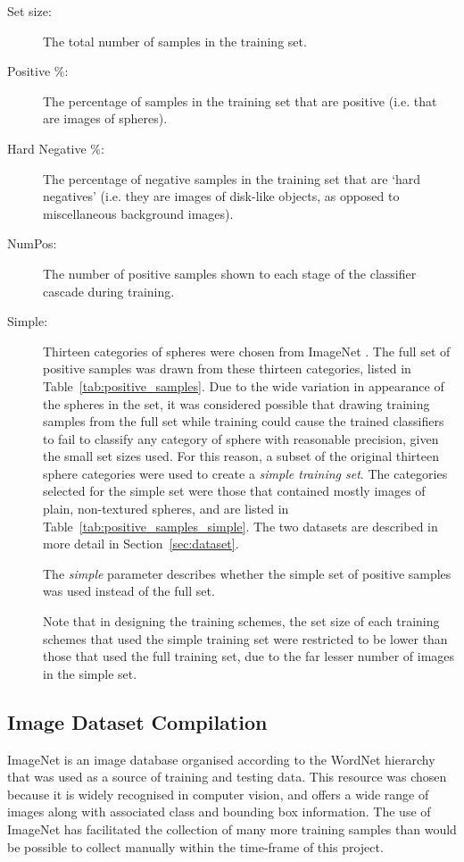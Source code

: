 \documentclass{sig-alternate-05-2015}
\newcommand{\scarequotes}[1]{`#1'}
\newcommand{\newterm}[1]{{\textit{#1}}}
\newcommand{\citep}[1]{\cite{#1}}
\begin{document}
{		\begin{description}
			\item[Set size:] The total number of samples in the training set.
			\item[Positive \%:] The percentage of samples in the training set that are positive (i.e. that are images of spheres).
			\item[Hard Negative \%:] The percentage of negative samples in the training set that are \scarequotes{hard negatives} (i.e. they are images of disk-like objects, as opposed to miscellaneous background images).
			\item[NumPos:] The number of positive samples shown to each stage of the classifier cascade during training.
			\item[Simple:]
				Thirteen categories of spheres were chosen from ImageNet \citep{imagenet_cvpr09}.
				The full set of positive samples was drawn from these thirteen categories, listed in Table~\ref{tab:positive_samples}.
				Due to the wide variation in appearance of the spheres in the set, it was considered possible that drawing training samples from the full set while training could cause the trained classifiers to fail to classify any category of sphere with reasonable precision, given the small set sizes used.
				For this reason, a subset of the original thirteen sphere categories were used to create a \newterm{simple training set}.
				The categories selected for the simple set were those that contained mostly images of plain, non-textured spheres, and are listed in Table~\ref{tab:positive_samples_simple}. The two datasets are described in more detail in Section~\ref{sec:dataset}.

				The \newterm{simple} parameter describes whether the simple set of positive samples was used instead of the full set.

				Note that in designing the training schemes, the set size of each training schemes that used the simple training set were restricted to be lower than those that used the full training set, due to the far lesser number of images in the simple set.
		\end{description}

		\subsection{Image Dataset Compilation} {
		\label{sec:dataset}

			ImageNet \citep{imagenet_cvpr09} is an image database organised according to the WordNet hierarchy \citep{fellbaum1998wordnet} that was used as a source of training and testing data. This resource was chosen because it is widely recognised in computer vision, and offers a wide range of images along with associated class and bounding box information. The use of ImageNet has facilitated the collection of many more training samples than would be possible to collect manually within the time-frame of this project.

}}
\end{document}
